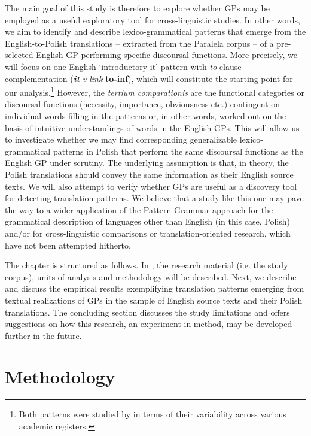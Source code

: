 \documentclass[output=paper]{langscibook}
\begin{document}
The main goal of this study is therefore to explore whether GPs may be employed as a useful exploratory tool for cross-linguistic studies. In other words, we aim to identify and describe lexico-grammatical patterns that emerge from the English-to-Polish translations -- extracted from the Paralela corpus \citep{Pęzik2016} -- of a pre-selected English GP performing specific discoursal functions. More precisely, we will focus on one English ‘introductory it’ pattern with \textit{to}{}-clause complementation (\textbf{\textit{it} }\textit{v-link}\textbf{ \textbf{{\ADJ}} \textbf{to-inf}}), which will constitute the starting point for our analysis.\footnote{Both patterns were studied by \citet{Groom2005} in terms of their variability across various academic registers.} However, the \textit{tertium comparationis} are the functional categories or discoursal functions (necessity, importance, obviousness etc.) contingent on individual words filling in the patterns or, in other words, worked out on the basis of intuitive understandings of words in the English GPs. This will allow us to investigate whether we may find corresponding generalizable lexico-grammatical patterns in Polish that perform the same discoursal functions as the English GP under scrutiny. The underlying assumption is that, in theory, the Polish translations should convey the same information as their English source texts. We will also attempt to verify whether GPs are useful as a discovery tool for detecting translation patterns. We believe that a study like this one may pave the way to a wider application of the Pattern Grammar approach for the grammatical description of languages other than English (in this case, Polish) and/or for cross-linguistic comparisons or translation-oriented research, which have not been attempted hitherto. 

The chapter is structured as follows. In , the research material (i.e. the study corpus), units of analysis and methodology will be described. Next, we describe and discuss the empirical results exemplifying translation patterns emerging from textual realizations of GPs in the sample of English source texts and their Polish translations. The concluding section discusses the study limitations and offers suggestions on how this research, an experiment in method, may be developed further in the future.

\section{Methodology}\label{sec:grabowski:2}
\end{document}
